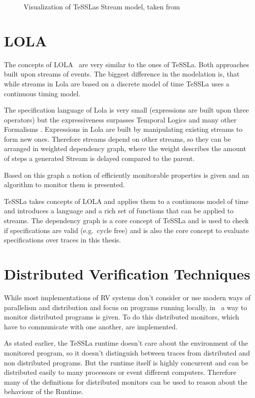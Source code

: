 \begin{figure}\label{fig:tessla_streams}
  
  \caption{Visualization of TeSSLas Stream model, taken from~\cite{Decker2016}}
\end{figure}


\section{LOLA}
\label{sec:related:lola}

The concepts of LOLA~\cite{DAngelo2005} are very similar to the ones of TeSSLa.
Both approaches built upon streams of events.
The biggest difference in the modelation is, that while streams in Lola are based on a discrete model of time TeSSLa uses a continuous timing model.

The specification language of Lola is very small (expressions are built upon three operators) but the expressiveness surpasses Temporal Logics and many other Formalisms \citep{DAngelo2005}.
Expressions in Lola are built by manipulating existing streams to form new ones.
Therefore streams depend on other streams, so they can be arranged in weighted dependency graph, where the weight describes the amount of steps a generated Stream is delayed compared to the parent.

Based on this graph a notion of efficiently monitorable properties is given and an algorithm to monitor them is presented.

TeSSLa takes concepts of LOLA and applies them to a continuous model of time and introduces a language and a rich set of functions that can be applied to streams.
The dependency graph is a core concept of TeSSLa and is used to check if specifications are valid (e.g.\ cycle free) and is also the core concept to evaluate specifications over traces in this thesis.

\section{Distributed Verification Techniques}
\label{sec:related:distributed}

While most implementations of RV systems don't consider or use modern ways of parallelism and distribution and focus on programs running locally, in~\cite{Mostafa2015} a way to monitor distributed programs is given.
To do this distributed monitors, which have to communicate with one another, are implemented.

As stated earlier, the TeSSLa runtime doesn't care about the environment of the monitored program, so it doesn't distinguish between traces from distributed and non distributed programs.
But the runtime itself is highly concurrent and can be distributed easily to many processors or event different computers.
Therefore many of the definitions for distributed monitors can be used to reason about the behaviour of the Runtime.


